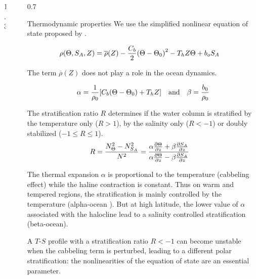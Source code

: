 \documentclass[final]{beamer}
\newlength{\sepwidth}
\newlength{\colwidth}
\newcommand{\separatorcolumn}{\begin{column}{\sepwidth}\end{column}}
\begin{document}
\begin{frame}[t]
\begin{columns}[t]
\begin{column}{1.3\colwidth}
\end{column}

\separatorcolumn

\begin{column}{0.7\colwidth}
  \vspace{1.65cm}
  \begin{exampleblock}{Thermodynamic properties}
    We use the simplified nonlinear equation of state proposed
    by \citet{roquet_defining_2015}.

    \begin{align}
      \rho(\Theta, S_A, Z) &= \overline{\rho}(Z)
      - \frac{C_b}{2} \qty(\Theta - \Theta_0)^2
      - T_h Z \Theta
      + b_o S_A
    \end{align}

    The term $\overline{\rho}(Z)$ does not play a role in the
    ocean dynamics.


    \begin{align}
      \alpha = \frac{1}{\rho_0} \qty[C_b (\Theta - \Theta_0) + T_h Z]
      \qand
      \beta = \frac{b_0}{\rho_0}
    \end{align}
    
    The stratification ratio $R$ determines if the water column is stratified
    by the temperature only ($R>1$), by the salinity only ($R<-1$) or doubly
    stabilized ($-1 \leq R \leq 1$).
    \begin{align}
      R &= \frac{N_\Theta^2 - N_{S_A}^2}{N^2}
      = \frac{\alpha \pdv{\Theta}{z} + \beta \pdv{S_A}{z}}
      {\alpha \pdv{\Theta}{z} - \beta \pdv{S_A}{z}}
    \end{align}
    
    The thermal expansion $\alpha$ is proportional to the temperature
    (cabbeling effect) while the haline contraction is constant.    
    Thus on warm and tempered regions, the stratification is mainly controlled
    by the temperature (alpha-ocean \citep{carmack_alpha/beta_2007}).
    But at high latitude, the lower value of $\alpha$ associated
    with the halocline lead to a salinity controlled stratification (beta-ocean).

    A $T$-$S$ profile with a stratification ratio $R<-1$ can become unstable when
    the cabbeling term is perturbed, leading to a different polar stratification:
    the nonlinearities of the equation of state are an essential parameter.
    

\end{exampleblock}
\end{column}
\end{columns}
\end{frame}
\end{document}
